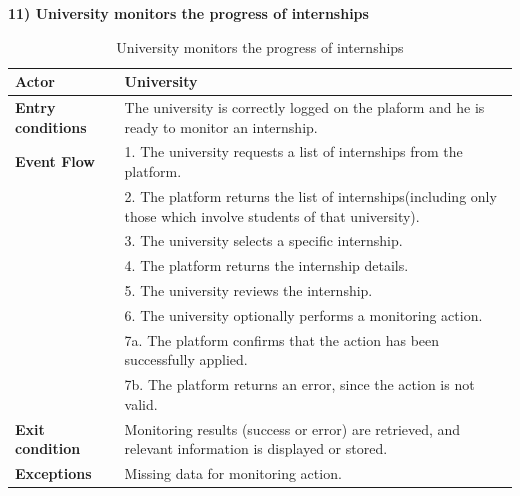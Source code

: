 \textbf{11) University monitors the progress of internships}\\

\begin{table}[h!]
    \centering
    \begin{tabular}{lp{10cm}}
        \textbf{Actor} & University \\ \hline
        \textbf{Entry conditions} & The university is correctly logged on the plaform and he is ready to monitor an internship. \\ \hline
        \textbf{Event Flow} &
        1. The university requests a list of internships  from the platform. \\
        & 2. The platform returns the list of internships(including only those which involve students of that university). \\
        & 3. The university selects a specific internship. \\
        & 4. The platform returns the internship details. \\
        & 5. The university reviews the internship. \\
        & 6. The university optionally performs a monitoring action. \\
        & 7a. The platform confirms that the action has been successfully applied. \\
        & 7b. The platform returns an error, since the action is not valid. \\
        \hline
        \textbf{Exit condition} & Monitoring results (success or error) are retrieved, and relevant information is displayed or stored. \\ \hline
        \textbf{Exceptions} & Missing data for monitoring action.
    \end{tabular}
    \caption{University monitors the progress of internships}
    \label{tab:university_monitors_internships}
\end{table}


